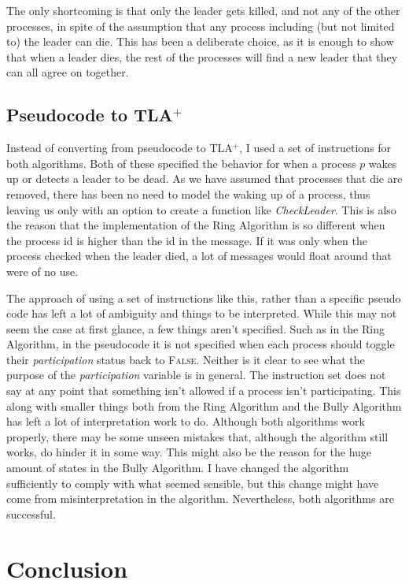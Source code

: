 \documentclass{report}
\begin{document}
The only shortcoming is that only the leader gets killed, and not any of the other processes, in spite of the assumption that any process including (but not limited to) the leader can die. This has been a deliberate choice, as it is enough to show that when a leader dies, the rest of the processes will find a new leader that they can all agree on together.

\section{Pseudocode to TLA$^{+}$}

Instead of converting from pseudocode to TLA$^{+}$, I used a set of instructions for both algorithms. Both of these specified the behavior for when a process $p$ wakes up or detects a leader to be dead. As we have assumed that processes that die are removed, there has been no need to model the waking up of a process, thus leaving us only with an option to create a function like \textit{CheckLeader}. This is also the reason that the implementation of the Ring Algorithm is so different when the process id is higher than the id in the message. If it was only when the process checked when the leader died, a lot of messages would float around that were of no use.

The approach of using a set of instructions like this, rather than a specific pseudo code has left a lot of ambiguity and things to be interpreted. While this may not seem the case at first glance, a few things aren't specified. Such as in the Ring Algorithm, in the pseudocode it is not specified when each process should toggle their \textit{participation} status back to \textsc{False}. Neither is it clear to see what the purpose of the \textit{participation} variable is in general. The instruction set does not say at any point that something isn't allowed if a process isn't participating. This along with smaller things both from the Ring Algorithm and the Bully Algorithm has left a lot of interpretation work to do. Although both algorithms work properly, there may be some unseen mistakes that, although the algorithm still works, do hinder it in some way. This might also be the reason for the huge amount of states in the Bully Algorithm. I have changed the algorithm sufficiently to comply with what seemed sensible, but this change might have come from misinterpretation in the algorithm. Nevertheless, both algorithms are successful.


\chapter{Conclusion}
\end{document}
